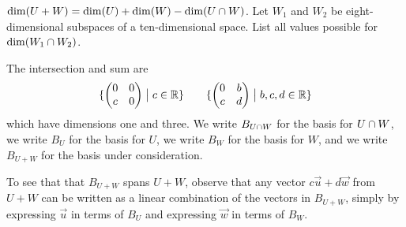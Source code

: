 \begin{exercises}
\begin{exparts}
          $\dim (U+W)=\dim(U)+\dim(W)-\dim(U\cap W)$.
      \partsitem Let \( W_1 \) and \( W_2 \) be eight-dimensional 
        subspaces of a ten-di\-men\-sion\-al space.
       List all values possible for \( \dim(W_1\cap W_2) \).
    \end{exparts}
    \begin{answer}
      \begin{exparts}
        \partsitem The intersection and sum are
          \begin{equation*}
             \mbox{$\{\begin{pmatrix}
                    0  &0  \\
                    c  &0
                  \end{pmatrix} \bigm| c\in\mathbb{R}  \}$}
             \qquad
             \mbox{$\{\begin{pmatrix}
                    0  &b  \\
                    c  &d
                   \end{pmatrix} \bigm| b,c,d\in\mathbb{R}  \}$}
          \end{equation*}
        which have dimensions one and three.
      \partsitem We write $B_{U\cap W}$ for the basis for 
        $U\cap W$,
        we write $B_U$ for the basis for $U$, 
        we write $B_W$ for the basis for $W$,
        and we write $B_{U+W}$ for the basis under consideration.

        To see that that $B_{U+W}$ spans $U+W$, observe that
        any vector $c\vec{u}+d\vec{w}$ from $U+W$ can be written as a linear
        combination of the vectors in $B_{U+W}$, 
        simply by expressing $\vec{u}$ in 
        terms of $B_U$ and expressing $\vec{w}$ in terms of $B_W$.


\end{exparts}
\end{answer}
\end{exercises}
